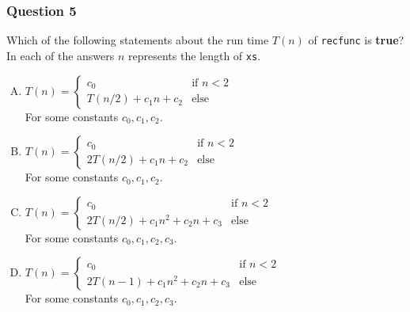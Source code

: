 \begin{frame}
	\frametitle{Question 5}
	
		\scriptsize
	Which of the following statements about the run time $T(n)$ of \texttt{recfunc} is \textbf{true}? In each of the
	answers $n$ represents the length of \texttt{xs}.
	\begin{multicols}{2}
	\begin{enumerate}[A.]
		\scriptsize
		\item $T(n) = \begin{cases}
			c_0 & \text{if } n < 2\\
			T(n/2) + c_1n + c_2 & \text{else}
		\end{cases}$\\ For some constants $c_0, c_1, c_2$.
	\item $T(n) = \begin{cases}
			c_0 & \text{if } n < 2\\
			2T(n/2) + c_1n + c_2 & \text{else}
		\end{cases}$\\ For some constants $c_0, c_1, c_2$.
	\item $T(n) = \begin{cases}
			c_0 & \text{if } n < 2\\
			2T(n/2) + c_1n^2 + c_2n + c_3 & \text{else}
		\end{cases}$\\ For some constants $c_0, c_1, c_2, c_3$.
	\item $T(n) = \begin{cases}
			c_0 & \text{if } n < 2\\
			2T(n-1) + c_1n^2 + c_2n + c_3 & \text{else}
		\end{cases}$\\ For some constants $c_0, c_1, c_2, c_3$.
	\end{enumerate}
\end{multicols}
\end{frame}

